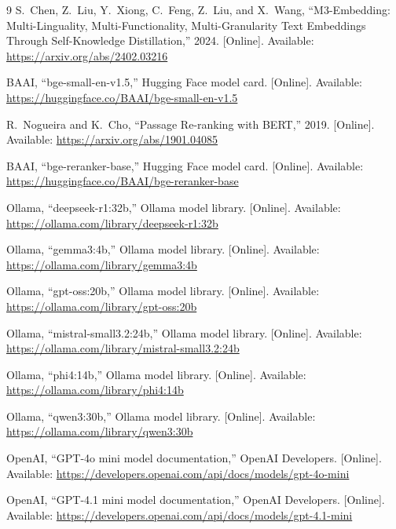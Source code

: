 \begin{thebibliography}{9}
\label{bib:bgem3paper}
S.~Chen, Z.~Liu, Y.~Xiong, C.~Feng, Z.~Liu, and X.~Wang,
``M3-Embedding: Multi-Linguality, Multi-Functionality, Multi-Granularity Text Embeddings Through Self-Knowledge Distillation,''
2024.
[Online]. Available: \url{https://arxiv.org/abs/2402.03216}

\label{bib:bgesmallhf}
BAAI,
``bge-small-en-v1.5,''
Hugging Face model card.
[Online]. Available: \url{https://huggingface.co/BAAI/bge-small-en-v1.5}

\label{bib:nogueira2019bert}
R.~Nogueira and K.~Cho,
``Passage Re-ranking with BERT,''
2019.
[Online]. Available: \url{https://arxiv.org/abs/1901.04085}

\label{bib:bgererankerhf}
BAAI,
``bge-reranker-base,''
Hugging Face model card.
[Online]. Available: \url{https://huggingface.co/BAAI/bge-reranker-base}

\label{bib:ollama_deepseek32b}
Ollama,
``deepseek-r1:32b,''
Ollama model library.
[Online]. Available: \url{https://ollama.com/library/deepseek-r1:32b}

\label{bib:ollama_gemma34b}
Ollama,
``gemma3:4b,''
Ollama model library.
[Online]. Available: \url{https://ollama.com/library/gemma3:4b}

\label{bib:ollama_gptoss20b}
Ollama,
``gpt-oss:20b,''
Ollama model library.
[Online]. Available: \url{https://ollama.com/library/gpt-oss:20b}

\label{bib:ollama_mistralsmall32_24b}
Ollama,
``mistral-small3.2:24b,''
Ollama model library.
[Online]. Available: \url{https://ollama.com/library/mistral-small3.2:24b}

\label{bib:ollama_phi414b}
Ollama,
``phi4:14b,''
Ollama model library.
[Online]. Available: \url{https://ollama.com/library/phi4:14b}

\label{bib:ollama_qwen330b}
Ollama,
``qwen3:30b,''
Ollama model library.
[Online]. Available: \url{https://ollama.com/library/qwen3:30b}

\label{bib:openai_gpt4omini}
OpenAI,
``GPT-4o mini model documentation,''
OpenAI Developers.
[Online]. Available: \url{https://developers.openai.com/api/docs/models/gpt-4o-mini}

\label{bib:openai_gpt41mini}
OpenAI,
``GPT-4.1 mini model documentation,''
OpenAI Developers.
[Online]. Available: \url{https://developers.openai.com/api/docs/models/gpt-4.1-mini}

\end{thebibliography}
